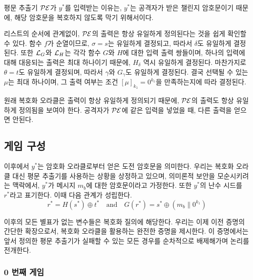 \begin{memo}
	평문 추출기 $\mathcal{PE}$가 $y^*$를 입력받는 이유는, $y^*$는 공격자가 받은
	챌린지 암호문이기 때문에, 해당 암호문을 복호하지 않도록 막기 위해서이다.
\end{memo}

리스트의 순서에 관계없이, $\mathcal{PE}$의 출력은 항상 유일하게 정의된다는 것을 쉽게
확인할 수 있다. 함수 $f$가 순열이므로, $\sigma = s$는 유일하게 결정되고, 따라서
$\delta$도 유일하게 결정된다. 또한 $\mathcal{L}_{G}$와 $\mathcal{L}_{H}$는 각각 함수 $G$와 $H$에
대한 입력 출력 쌍들이며, 하나의 입력에 대해 대응되는 출력은 최대 하나이기
때문에, $H_\delta$ 역시 유일하게 결정된다. 마찬가지로 $\theta = t$도 유일하게
결정되며, 따라서 $\gamma$와 $G_\gamma$도 유일하게 결정된다. 결국 선택될 수 있는
$\mu$는 최대 하나이며, 그 출력 여부는 조건 $[\mu]_{k_1} = 0^{k_1}$을
만족하는지에 따라 결정된다.

\begin{memo}
	원래 복호화 오라클은 출력이 항상 유일하게 정의되기 때문에, $\mathcal{PE}$의 출력도
	항상 유일하게 정의됨을 보여야 한다. 공격자가 $\mathcal{PE}$에 같은 입력을 넣었을 때,
	다른 출력을 얻으면 안된다.
\end{memo}

\newpage
\subsection{게임 구성}

이후에서 $y^*$는 암호화 오라클로부터 얻은 도전 암호문을 의미한다. 우리는 복호화
오라클 대신 평문 추출기를 사용하는 상황을 상정하고 있으며, 의미론적 보안을
모순시키려는 맥락에서, $y^*$가 메시지 $m_b$에 대한 암호문이라고 가정한다. 또한
$y^*$의 난수 시드를 $r^*$라고 표기한다. 이때 다음 관계가 성립한다.
$$
	r^* = H(s^*) \oplus t^* \quad \text{and} \quad G(r^*) = s^* \oplus (m_b \parallel 0^{k_1})
$$

이후의 모든 별표가 없는 변수들은 복호화 질의에 해당한다. 우리는 이제 이전 증명의
간단한 확장으로서, 복호화 오라클을 활용하는 완전한 증명을 제시한다. 이
증명에서는 앞서 정의한 평문 추출기가 실패할 수 있는 모든 경우를 순차적으로
배제해가며 논리를 전개한다.

\subsubsection{0 번째 게임}

